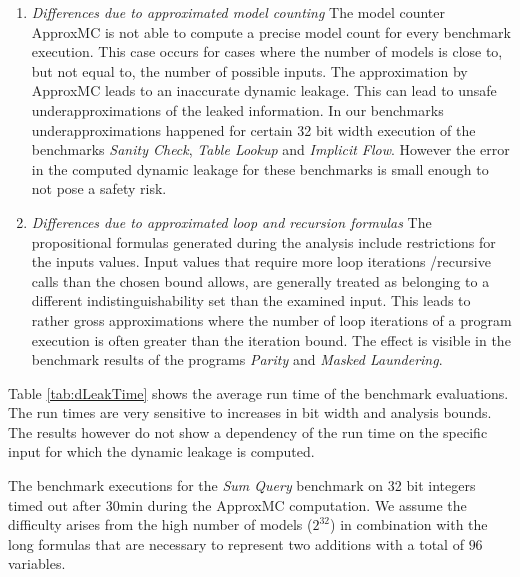 \begin{enumerate}
    \item \emph{Differences due to approximated model counting} The model counter ApproxMC is not able to compute a precise model count for every benchmark execution. This case occurs for cases where the number of models is close to, but not equal to, the number of possible inputs. The approximation by ApproxMC leads to an inaccurate dynamic leakage. This can lead to unsafe underapproximations of the leaked information. In our benchmarks underapproximations happened for certain 32 bit width execution of the benchmarks \emph{Sanity Check}, \emph{Table Lookup} and \emph{Implicit Flow}. However the error in the computed dynamic leakage for these benchmarks is small enough to not pose a safety risk.
    \item \emph{Differences due to approximated loop and recursion formulas} The propositional formulas generated during the analysis include restrictions for the inputs values. Input values that require more loop iterations /recursive calls than the chosen bound allows, are generally treated as belonging to a different indistinguishability set than the examined input. This leads to rather gross approximations where the number of loop iterations of a program execution is often greater than the iteration bound. The effect is visible in the benchmark results of the programs \emph{Parity} and \emph{Masked Laundering}.
\end{enumerate}

Table \ref{tab:dLeakTime} shows the average run time of the benchmark evaluations. The run times are very sensitive to increases in bit width and analysis bounds. The results however do not show a dependency of the run time on the specific input for which the dynamic leakage is computed.

The benchmark executions for the \emph{Sum Query} benchmark on 32 bit integers timed out after 30min during the ApproxMC computation. We assume the difficulty arises from the high number of models ($2^32$) in combination with the long formulas that are necessary to represent two additions with a total of $96$ variables.


